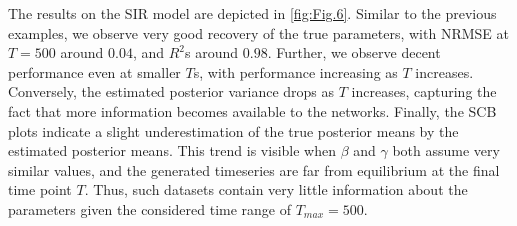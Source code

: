 \documentclass[9pt,twoside,lineno]{pnas-new}
\begin{document}
The results on the SIR model are depicted in \autoref{fig:Fig.6}. Similar to the previous examples, we observe very good recovery of the true parameters, with NRMSE at $T=500$ around $0.04$, and $R^{2}$s around $0.98$. Further, we observe decent performance even at smaller $T$s, with performance increasing as $T$ increases. Conversely, the estimated posterior variance drops as $T$ increases, capturing the fact that more information becomes available to the networks. Finally, the SCB plots indicate a slight underestimation of the true posterior means by the estimated posterior means. This trend is visible when $\beta$ and $\gamma$ both assume very similar values, and the generated timeseries are far from equilibrium at the final time point $T$. Thus, such datasets contain very little information about the parameters given the considered time range of $T_{max}=500$.
\end{document}
